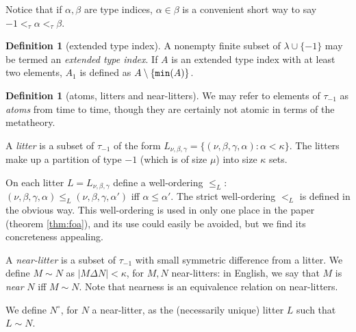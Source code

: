 \documentclass[112pt]{article}
\theoremstyle{definition}
\newtheorem{definition}[theorem]{Definition}
\theoremstyle{remark}
\begin{document}
Notice that if $\alpha,\beta$ are type indices, $\alpha\in \beta$ is a convenient short way to say $-1 <_\tau \alpha <_\tau \beta$.

\begin{definition}[extended type index]\label{def:extended_type_index}
A nonempty finite subset of $\lambda \cup \{-1\}$ may be termed an {\em extended type index}.  If $A$ is an extended type index with at least two elements, $A_1$ is defined as $A \setminus \{{\tt min}(A)\}$.
\end{definition}

\begin{definition}[atoms, litters and near-litters]\label{def:atom_litter_near_litter}
We may refer to elements of $\tau_{-1}$ as {\em atoms\/} from time to time, though they are certainly not atomic in terms of the metatheory.

A {\em litter\/} is a subset of $\tau_{-1}$ of the form $L_{\nu,\beta,\gamma} = \{(\nu,\beta,\gamma,\alpha):\alpha<\kappa\}$.  The litters make up a partition of type $-1$
(which is of size $\mu$) into size $\kappa$ sets.

On each litter $L =  L_{\nu,\beta,\gamma}$ define a well-ordering $\leq_L$:  $(\nu,\beta,\gamma,\alpha) \leq_L (\nu,\beta,\gamma,\alpha')$  iff $\alpha\leq \alpha'$.
The strict well-ordering $<_L$ is defined in the obvious way.  This well-ordering is used in only one place in the paper (theorem \ref{thm:foa}), and its use could easily be avoided, but we find its concreteness appealing.

A {\em near-litter\/} is a subset of $\tau_{-1}$ with small symmetric difference from a litter.  We define $M \sim N$ as $|M \Delta N|<\kappa$, for $M,N$ near-litters:  in English, we say that $M$ is {\em near\/} $N$ iff $M \sim N$.  Note that nearness is an equivalence relation on near-litters.

We define $N^\circ$, for $N$ a near-litter, as the (necessarily unique) litter $L$ such that $L \sim N$.
\end{definition}
\end{document}
